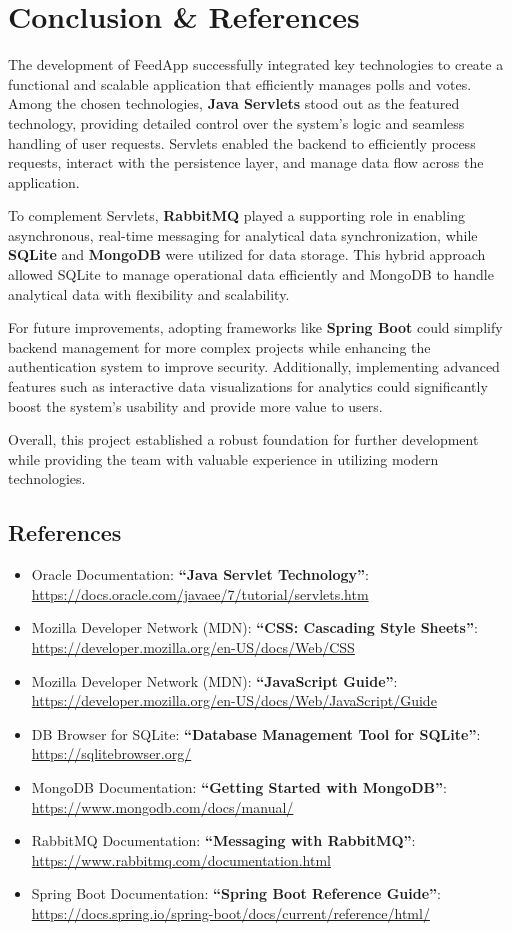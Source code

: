 \section{Conclusion \& References}
\label{conclusion}

The development of FeedApp successfully integrated key technologies to create a functional and scalable application that efficiently manages polls and votes. Among the chosen technologies, \textbf{Java Servlets} stood out as the featured technology, providing detailed control over the system's logic and seamless handling of user requests. Servlets enabled the backend to efficiently process requests, interact with the persistence layer, and manage data flow across the application.

To complement Servlets, \textbf{RabbitMQ} played a supporting role in enabling asynchronous, real-time messaging for analytical data synchronization, while \textbf{SQLite} and \textbf{MongoDB} were utilized for data storage. This hybrid approach allowed SQLite to manage operational data efficiently and MongoDB to handle analytical data with flexibility and scalability.

For future improvements, adopting frameworks like \textbf{Spring Boot} could simplify backend management for more complex projects while enhancing the authentication system to improve security. Additionally, implementing advanced features such as interactive data visualizations for analytics could significantly boost the system's usability and provide more value to users.

Overall, this project established a robust foundation for further development while providing the team with valuable experience in utilizing modern technologies.

\subsection*{References}

\begin{itemize}
    \item Oracle Documentation: \textbf{``Java Servlet Technology''}: \url{https://docs.oracle.com/javaee/7/tutorial/servlets.htm}
    \item Mozilla Developer Network (MDN): \textbf{``CSS: Cascading Style Sheets''}: \url{https://developer.mozilla.org/en-US/docs/Web/CSS}
    \item Mozilla Developer Network (MDN): \textbf{``JavaScript Guide''}: \url{https://developer.mozilla.org/en-US/docs/Web/JavaScript/Guide}
    \item DB Browser for SQLite: \textbf{``Database Management Tool for SQLite''}: \url{https://sqlitebrowser.org/}
    \item MongoDB Documentation: \textbf{``Getting Started with MongoDB''}: \url{https://www.mongodb.com/docs/manual/}
    \item RabbitMQ Documentation: \textbf{``Messaging with RabbitMQ''}: \url{https://www.rabbitmq.com/documentation.html}
    \item Spring Boot Documentation: \textbf{``Spring Boot Reference Guide''}: \url{https://docs.spring.io/spring-boot/docs/current/reference/html/}
\end{itemize}

